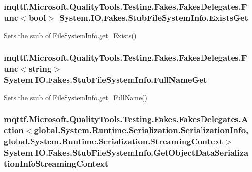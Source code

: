\hypertarget{class_system_1_1_i_o_1_1_fakes_1_1_stub_file_system_info_aa0fde4ab534435bca656f54477f55ca2}{
\subsubsection[{Exists\-Get}]{\setlength{\rightskip}{0pt plus 5cm}mqttf.\-Microsoft.\-Quality\-Tools.\-Testing.\-Fakes.\-Fakes\-Delegates.\-Func$<$bool$>$ System.\-I\-O.\-Fakes.\-Stub\-File\-System\-Info.\-Exists\-Get}}\label{class_system_1_1_i_o_1_1_fakes_1_1_stub_file_system_info_aa0fde4ab534435bca656f54477f55ca2}


Sets the stub of File\-System\-Info.\-get\-\_\-\-Exists()

\hypertarget{class_system_1_1_i_o_1_1_fakes_1_1_stub_file_system_info_ada4911278ba11413b3bb291b1da41b6e}{
\subsubsection[{Full\-Name\-Get}]{\setlength{\rightskip}{0pt plus 5cm}mqttf.\-Microsoft.\-Quality\-Tools.\-Testing.\-Fakes.\-Fakes\-Delegates.\-Func$<$string$>$ System.\-I\-O.\-Fakes.\-Stub\-File\-System\-Info.\-Full\-Name\-Get}}\label{class_system_1_1_i_o_1_1_fakes_1_1_stub_file_system_info_ada4911278ba11413b3bb291b1da41b6e}


Sets the stub of File\-System\-Info.\-get\-\_\-\-Full\-Name()

\hypertarget{class_system_1_1_i_o_1_1_fakes_1_1_stub_file_system_info_a67447e484510f663a3511e1a94c78e39}{
\subsubsection[{Get\-Object\-Data\-Serialization\-Info\-Streaming\-Context}]{\setlength{\rightskip}{0pt plus 5cm}mqttf.\-Microsoft.\-Quality\-Tools.\-Testing.\-Fakes.\-Fakes\-Delegates.\-Action$<$global.\-System.\-Runtime.\-Serialization.\-Serialization\-Info, global.\-System.\-Runtime.\-Serialization.\-Streaming\-Context$>$ System.\-I\-O.\-Fakes.\-Stub\-File\-System\-Info.\-Get\-Object\-Data\-Serialization\-Info\-Streaming\-Context}}\label{class_system_1_1_i_o_1_1_fakes_1_1_stub_file_system_info_a67447e484510f663a3511e1a94c78e39}


